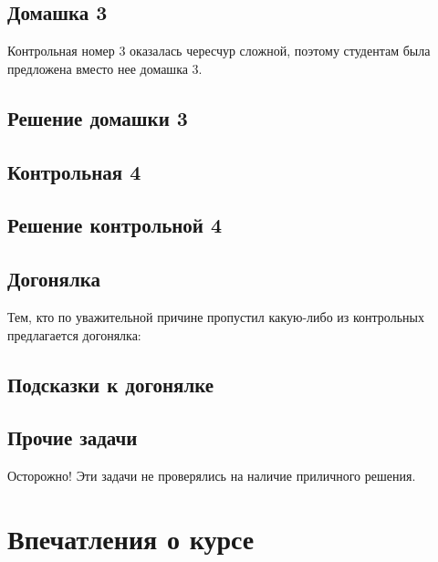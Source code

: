 \documentclass[11pt, openany]{book}
\numberwithin{equation}{page} %
\theoremstyle{definition} %
\theoremstyle{definition}
\theoremstyle{definition}
\begin{document}


\section{Домашка 3}

Контрольная номер 3 оказалась чересчур сложной, поэтому студентам была предложена вместо нее домашка 3.




\section{Решение домашки 3}






\section{Контрольная 4}



\section{Решение контрольной 4}




\section{Догонялка}

Тем, кто по уважительной причине пропустил какую-либо из контрольных предлагается догонялка:



\section{Подсказки к догонялке}



\section{Прочие задачи}

Осторожно! Эти задачи не проверялись на наличие приличного решения.




\chapter*{Впечатления о курсе}
\end{document}
